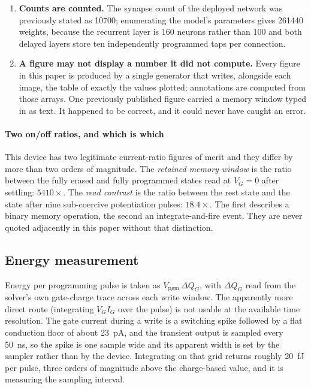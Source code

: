 \begin{enumerate}
\item \textbf{Counts are counted.} The synapse count of the deployed network was
  previously stated as \num{10700}; enumerating the model's parameters gives
  \num{261440} weights, because the recurrent layer is 160 neurons rather than 100 and
  both delayed layers store ten independently programmed taps per connection.

\item \textbf{A figure may not display a number it did not compute.} Every figure in this
  paper is produced by a single generator that writes, alongside each image, the table
  of exactly the values plotted; annotations are computed from those arrays. One
  previously published figure carried a memory window typed in as text. It happened to
  be correct, and it could never have caught an error.
\end{enumerate}

\paragraph*{Two on/off ratios, and which is which}
This device has two legitimate current-ratio figures of merit and they differ by more
than two orders of magnitude. The \emph{retained memory window} is the ratio between the
fully erased and fully programmed states read at $V_G=0$ after settling: $5410\times$.
The \emph{read contrast} is the ratio between the rest state and the state after nine
sub-coercive potentiation pulses: $18.4\times$. The first describes a binary memory
operation, the second an integrate-and-fire event. They are never quoted adjacently in
this paper without that distinction.

\subsection{Energy measurement}

Energy per programming pulse is taken as $V_\mathrm{pgm}\,\Delta Q_G$, with $\Delta Q_G$
read from the solver's own gate-charge trace across each write window. The apparently
more direct route (integrating $V_G I_G$ over the pulse) is not usable at the
available time resolution. The gate current during a write is a switching spike followed
by a flat conduction floor of about \SI{23}{\pico\ampere}, and the transient output is
sampled every \SI{50}{\nano\second}, so the spike is one sample wide and its apparent
width is set by the sampler rather than by the device. Integrating on that grid returns
roughly \SI{20}{\femto\joule} per pulse, three orders of magnitude above the
charge-based value, and it is measuring the sampling interval.

